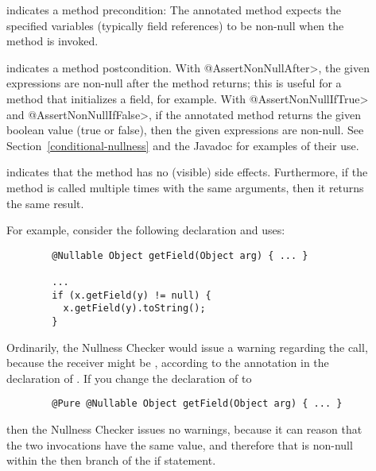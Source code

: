 \begin{description}

\item[]
  indicates a method precondition:  The annotated method expects the
  specified variables (typically field references) to be non-null when the
  method is invoked.

\item[]
\item[]
\item[]
  indicates a method postcondition.  With \<@AssertNonNullAfter>, the given
  expressions are non-null after the method returns; this is useful for a
  method that initializes a field, for example.  With
  \<@AssertNonNullIfTrue> and \<@AssertNonNullIfFalse>, if the annotated
  method returns the given boolean value (true or false), then the given
  expressions are non-null.  See Section~\ref{conditional-nullness} and the
  Javadoc for examples of their use.

\item[]
  indicates that the method has no (visible) side effects.
  Furthermore, if the method is called multiple times with the same
  arguments, then it returns the same result.

  For example, consider the
  following declaration and uses:

\begin{Verbatim}
        @Nullable Object getField(Object arg) { ... }

        ...
        if (x.getField(y) != null) {
          x.getField(y).toString();
        }
\end{Verbatim}

  \noindent
  Ordinarily, the Nullness Checker would issue a warning regarding the
   call, because the receiver  might
  be , according to the  annotation in the
  declaration of .  If you change the declaration of
   to

\begin{Verbatim}
        @Pure @Nullable Object getField(Object arg) { ... }
\end{Verbatim}

  \noindent
  then the Nullness Checker issues no warnings, because it can reason that
  the two invocations  have the same value, and
  therefore that  is non-null within the then branch
  of the if statement.



\end{description}
